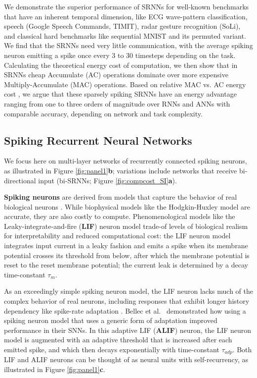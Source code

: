 \documentclass[fleqn,10pt]{wlscirep}
\begin{document}
We demonstrate the superior performance of SRNNs for well-known benchmarks that have an inherent temporal dimension, like ECG wave-pattern classification, speech (Google Speech Commands, TIMIT), radar gesture recognition (SoLi), and classical hard benchmarks like sequential MNIST and its permuted variant. We find that the SRNNs need very little communication, with the average spiking neuron emitting a spike once every 3 to 30 timesteps depending on the task. Calculating the theoretical energy cost of computation, we then show that in SRNNs cheap Accumulate (AC) operations dominate over more expensive Multiply-Accumulate (MAC) operations. Based on relative MAC vs. AC energy cost \cite{roy2019towards,Sengupta2019-tg}, we argue that these sparsely spiking SRNNs have an energy advantage ranging from one to three orders of magnitude over RNNs and ANNs with comparable accuracy, depending on network and task complexity. 









\subsection*{Spiking Recurrent Neural Networks}
We focus here on multi-layer networks of recurrently connected spiking neurons, as illustrated in Figure \ref{fig:panel1}\textbf{b}; variations include networks that receive bi-directional input (bi-SRNNs; Figure \ref{fig:compcost_SI}\textbf{a}).


{\bf Spiking neurons} are derived from models that capture the behavior of real biological neurons \cite{gerstner2002spiking}. While biophysical models like the Hodgkin-Huxley model are accurate, they are also costly to compute\cite{izhikevich2003simple}. Phenomenological models like the Leaky-integrate-and-fire ({\bf LIF}) neuron model trade-of levels of biological realism for interpretability and reduced computational cost: the LIF neuron model integrates input current in a leaky fashion and emits a spike when its membrane potential crosses its threshold from below, after which the membrane potential is reset to the reset membrane potential; the current leak is determined by a decay time-constant $\tau_m$. 

As an exceedingly simple spiking neuron model, the LIF neuron lacks much of the complex behavior of real neurons, including responses that exhibit longer history dependency like spike-rate adaptation \cite{izhikevich2003simple}. Bellec et al.~\cite{bellec2018long} demonstrated how using a spiking neuron model that uses a generic form of adaptation improved performance in their SNNs. In this adaptive LIF ({\bf ALIF}) neuron, the LIF neuron model is augmented with an adaptive threshold that is increased after each emitted spike, and which then decays exponentially with time-constant $\tau_{adp}$. Both LIF and ALIF neurons can be thought of as neural units with self-recurrency, as illustrated in Figure \ref{fig:panel1}\textbf{c}.
\end{document}
